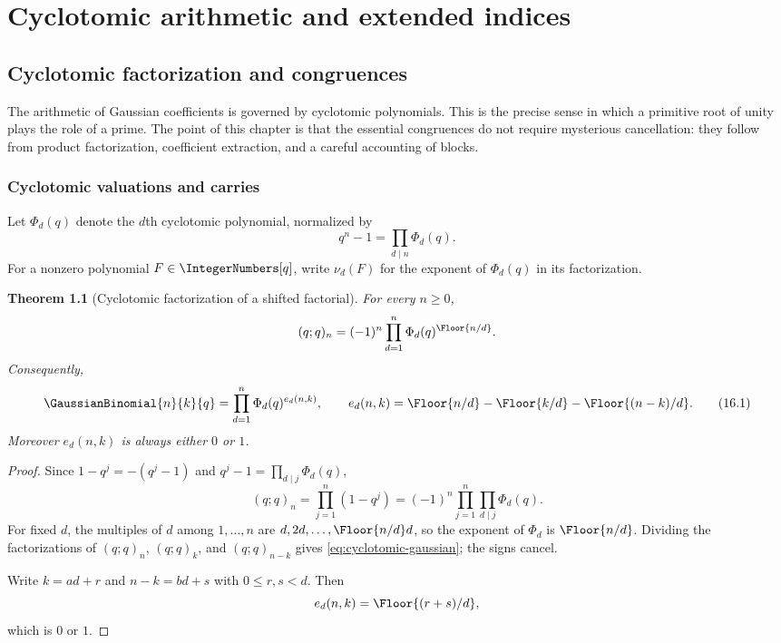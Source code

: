 \documentclass[11pt,a4paper,oneside,openany]{book}
\newtheorem{theorem}{Theorem}[chapter]
\theoremstyle{definition}
\theoremstyle{remark}
\begin{document}
\part{Cyclotomic arithmetic and extended indices}

\chapter{Cyclotomic factorization and congruences}\label{chap:cyclotomic}

The arithmetic of Gaussian coefficients is governed by cyclotomic polynomials.  This is the precise sense in which a primitive root of unity plays the role of a prime.  The point of this chapter is that the essential congruences do not require mysterious cancellation: they follow from product factorization, coefficient extraction, and a careful accounting of blocks.

\section{Cyclotomic valuations and carries}

Let $\Phi_d(q)$ denote the $d$th cyclotomic polynomial, normalized by
\[
 q^n-1=\prod_{d\mid n}\Phi_d(q).
\]
For a nonzero polynomial $F\in\IntegerNumbers[q]$, write $\nu_d(F)$ for the exponent of $\Phi_d(q)$ in its factorization.

\begin{theorem}[Cyclotomic factorization of a shifted factorial]\label{thm:cyclotomic-pochhammer}
For every $n\ge0$,
\[
 (q;q)_n=(-1)^n\prod_{d=1}^{n}\Phi_d(q)^{\Floor{n/d}}.
\]
Consequently,
\[
 \GaussianBinomial{n}{k}{q}
 =\prod_{d=1}^{n}\Phi_d(q)^{e_d(n,k)},
 \qquad
 e_d(n,k)=\Floor{n/d}-\Floor{k/d}-\Floor{(n-k)/d}.
 \tag{16.1}\label{eq:cyclotomic-gaussian}
\]
Moreover $e_d(n,k)$ is always either $0$ or $1$.
\end{theorem}

\begin{proof}
Since $1-q^j=-(q^j-1)$ and $q^j-1=\prod_{d\mid j}\Phi_d(q)$,
\[
 (q;q)_n
 =\prod_{j=1}^{n}(1-q^j)
 =(-1)^n\prod_{j=1}^{n}\prod_{d\mid j}\Phi_d(q).
\]
For fixed $d$, the multiples of $d$ among $1,\ldots,n$ are $d,2d,\ldots,\Floor{n/d}d$, so the exponent of $\Phi_d$ is $\Floor{n/d}$.  Dividing the factorizations of $(q;q)_n$, $(q;q)_k$, and $(q;q)_{n-k}$ gives \eqref{eq:cyclotomic-gaussian}; the signs cancel.

Write $k=ad+r$ and $n-k=bd+s$ with $0\le r,s<d$.  Then
\[
 e_d(n,k)=\Floor{(r+s)/d},
\]
which is $0$ or $1$.
\end{proof}
\end{document}
